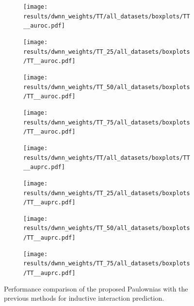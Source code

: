 \documentclass{article}
\begin{document}
\begin{figure}
    \centering
    \begin{subfigure}{.24\textwidth}
        \texttt{[image: results/dwnn\_weights/TT/all\_datasets/boxplots/TT\_\_auroc.pdf]}
    \end{subfigure}
    \begin{subfigure}{.24\textwidth}
        \texttt{[image: results/dwnn\_weights/TT\_25/all\_datasets/boxplots/TT\_\_auroc.pdf]}
    \end{subfigure}
    \begin{subfigure}{.24\textwidth}
        \texttt{[image: results/dwnn\_weights/TT\_50/all\_datasets/boxplots/TT\_\_auroc.pdf]}
    \end{subfigure}
    \begin{subfigure}{.24\textwidth}
        \texttt{[image: results/dwnn\_weights/TT\_75/all\_datasets/boxplots/TT\_\_auroc.pdf]}
    \end{subfigure}

     \begin{subfigure}{.24\textwidth}
        \texttt{[image: results/dwnn\_weights/TT/all\_datasets/boxplots/TT\_\_auprc.pdf]}
    \end{subfigure}
    \begin{subfigure}{.24\textwidth}
        \texttt{[image: results/dwnn\_weights/TT\_25/all\_datasets/boxplots/TT\_\_auprc.pdf]}
    \end{subfigure}
    \begin{subfigure}{.24\textwidth}
        \texttt{[image: results/dwnn\_weights/TT\_50/all\_datasets/boxplots/TT\_\_auprc.pdf]}
    \end{subfigure}
    \begin{subfigure}{.24\textwidth}
        \texttt{[image: results/dwnn\_weights/TT\_75/all\_datasets/boxplots/TT\_\_auprc.pdf]}
    \end{subfigure}   
    \caption{Performance comparison of the proposed Paulownias with the previous methods for inductive interaction prediction.}
    \label{fig:weights_TT}
\end{figure}
\end{document}
